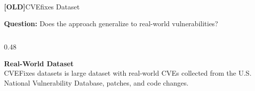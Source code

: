 \documentclass[aspectratio=169,10pt]{beamer}
\begin{document}
\begin{frame}{\textbf{[OLD]}CVEfixes Dataset }
  
  \textbf{Question:} Does the approach generalize to real-world vulnerabilities?
  \vspace{0.3cm}
  
\begin{columns}[T]
\begin{column}{0.48\textwidth}

  \textbf{Real-World Dataset}\\[3pt]
  {\small CVEFixes datasets is large dataset with real-world CVEs collected from the U.S. National Vulnerability Database, patches, and code changes.\\}
  
  \vspace{0.5em}
  \begin{center}
    

\end{center}
\end{column}
\end{columns}
\end{frame}
\end{document}
